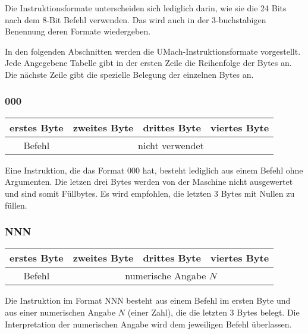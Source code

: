 Die Instruktionsformate unterscheiden sich lediglich darin, wie sie die 24 Bits
nach dem 8-Bit \gls{Befehl} verwenden. Das wird auch in der 3-buchstabigen
Benennung deren Formate wiedergeben.

In den folgenden Abschnitten werden die UMach-Instruktionsformate vorgestellt.
Jede Angegebene Tabelle gibt in der ersten Zeile die Reihenfolge der Bytes an. 
Die nächste Zeile gibt die spezielle Belegung der einzelnen Bytes an.



\subsubsection{000}
\label{000}

\begin{center}
  \begin{tabular}{|*{4}{c|}} \hline
    erstes Byte & zweites Byte  & drittes Byte  & viertes Byte \\\hline\hline
    Befehl      & \multicolumn{3}{c|}{nicht verwendet}         \\\hline
  \end{tabular}
\end{center}

Eine Instruktion, die das Format 000 hat, besteht lediglich aus einem Befehl
ohne Argumenten. Die letzen drei Bytes werden von der Maschine nicht
ausgewertet und sind somit Füllbytes. Es wird empfohlen, die letzten 3 Bytes mit
Nullen zu füllen.




\subsubsection{NNN}
\label{NNN}

\begin{center}
  \begin{tabular}{|*{4}{c|}}
    \hline
    erstes Byte  & zweites Byte  & drittes Byte  & viertes Byte \\\hline\hline
    Befehl       & \multicolumn{3}{c|}{numerische Angabe $N$}   \\\hline
  \end{tabular}
\end{center}

Die Instruktion im Format NNN besteht aus einem Befehl im ersten Byte und aus
einer numerischen Angabe  $N$ (einer Zahl), die die letzten 3 Bytes belegt.
Die Interpretation der numerischen Angabe wird dem jeweiligen Befehl überlassen.



